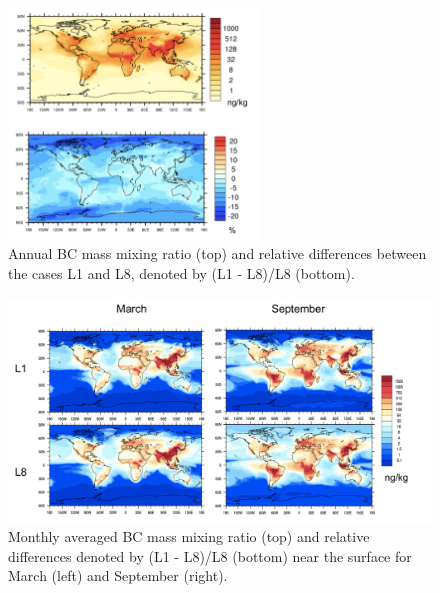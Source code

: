 \documentclass[12pt, fullpage]{uiucthesis2009}
\begin{document}
	
	\begin{figure}[h] 
		\begin{center}
			\includegraphics[width = 0.6\textwidth]{Figure13}
			\caption[Annually averaged BC mass mixing ratio (top) and relative differences denoted by (L1 - L8)/L8 (bottom)]{\label{fig_P13} Annual BC mass mixing ratio (top) and relative differences between the cases L1 and L8, denoted by (L1 - L8)/L8 (bottom).}
		\end{center}
	\end{figure}
	
	\begin{figure}[h] 
			\begin{center}
				\includegraphics[width = 1\textwidth]{Figure21}
				\caption[Monthly averaged BC mass mixing ratio (top) and relative differences denoted by (L1 - L8)/L8 (bottom) near the surface for March (left) and September (right).]{\label{fig_P21} Monthly averaged BC mass mixing ratio (top) and relative differences denoted by (L1 - L8)/L8 (bottom) near the surface for March (left) and September (right).}
			\end{center}
		\end{figure}
	
\end{document}
